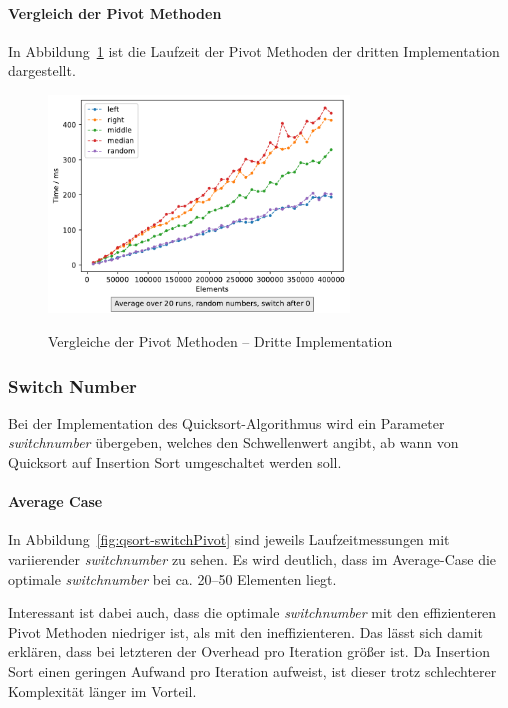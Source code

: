 \paragraph{Vergleich der Pivot Methoden}

In Abbildung~\ref{fig:qsort-impl3-2} ist die Laufzeit der Pivot Methoden der
dritten Implementation dargestellt.

\begin{figure}[hbt]
    \centering
    \caption{Vergleiche der Pivot Methoden -- Dritte Implementation}
    \includegraphics[width=8cm]
    {../out/pivotMethods.pdf}\label{fig:qsort-impl3-2}
\end{figure}

\FloatBarrier

\subsubsection{Switch Number}\label{subsubsec:switch-number}
Bei der Implementation des Quicksort-Algorithmus wird ein Parameter
\textit{switchnumber} übergeben, welches den Schwellenwert angibt, ab wann
von Quicksort auf Insertion Sort umgeschaltet werden soll.
\paragraph{Average Case}
In Abbildung~\ref{fig:qsort-switchPivot} sind
jeweils Laufzeitmessungen mit variierender \textit{switchnumber} zu sehen.
Es wird deutlich, dass im Average-Case die optimale \textit{switchnumber} bei
ca. 20--50 Elementen liegt.

Interessant ist dabei auch, dass die optimale \textit{switchnumber} mit den
effizienteren Pivot Methoden niedriger ist, als mit den ineffizienteren.
Das lässt sich damit erklären, dass bei letzteren der Overhead pro Iteration
größer ist.
Da Insertion Sort einen geringen Aufwand pro Iteration aufweist, ist dieser
trotz schlechterer Komplexität länger im Vorteil.

